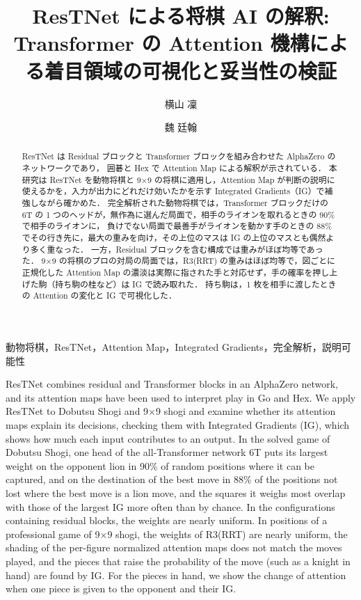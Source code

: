 \documentclass[submit]{ipsj}
\title{ResTNet による将棋 AI の解釈:\\
Transformer の Attention 機構による着目領域の可視化と妥当性の検証}
\author{横山 凜}{Rin Yokoyama}{KUT}[305151a@gs.kochi-tech.ac.jp]
\author{魏 廷翰}{Ting-Han Wei}{KUT}[tinghan.wei@kochi-tech.ac.jp]
\begin{document}
\begin{abstract}
ResTNet は Residual ブロックと Transformer ブロックを組み合わせた AlphaZero のネットワークであり，
囲碁と Hex で Attention Map による解釈が示されている．
本研究は ResTNet を動物将棋と 9×9 の将棋に適用し，Attention Map が判断の説明に使えるかを，入力が出力にどれだけ効いたかを示す Integrated Gradients（IG）で補強しながら確かめた．
完全解析された動物将棋では，Transformer ブロックだけの 6T の 1 つのヘッドが，無作為に選んだ局面で，相手のライオンを取れるときの 90\% で相手のライオンに，
負けでない局面で最善手がライオンを動かす手のときの 88\% でその行き先に，最大の重みを向け，その上位のマスは IG の上位のマスとも偶然より多く重なった．
一方，Residual ブロックを含む構成では重みがほぼ均等であった．
9×9 の将棋のプロの対局の局面では，R3(RRT) の重みはほぼ均等で，図ごとに正規化した Attention Map の濃淡は実際に指された手と対応せず，手の確率を押し上げた駒（持ち駒の桂など）は IG で読み取れた．
持ち駒は，1 枚を相手に渡したときの Attention の変化と IG で可視化した．
\end{abstract}

\begin{jkeyword}
動物将棋，ResTNet，Attention Map，Integrated Gradients，完全解析，説明可能性
\end{jkeyword}

\begin{eabstract}
ResTNet combines residual and Transformer blocks in an AlphaZero network, and its attention maps
have been used to interpret play in Go and Hex. We apply ResTNet to Dobutsu Shogi and 9×9 shogi and examine whether its attention maps explain its decisions,
checking them with Integrated Gradients (IG), which shows how much each input contributes to an output.
In the solved game of Dobutsu Shogi, one head of the all-Transformer network 6T puts its largest weight on the opponent lion in 90\% of random positions where it can be captured,
and on the destination of the best move in 88\% of the positions not lost where the best move is a lion move, and the squares it weighs most overlap with those of the largest IG more often than by chance.
In the configurations containing residual blocks, the weights are nearly uniform.
In positions of a professional game of 9×9 shogi, the weights of R3(RRT) are nearly uniform, the shading of the per-figure normalized attention maps does not match the moves played,
and the pieces that raise the probability of the move (such as a knight in hand) are found by IG.
For the pieces in hand, we show the change of attention when one piece is given to the opponent and their IG.
\end{eabstract}
\end{document}
